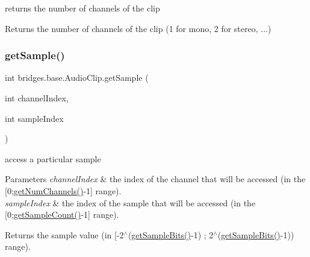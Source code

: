 returns the number of channels of the clip 

\begin{DoxyReturn}{Returns}
the number of channels of the clip (1 for mono, 2 for stereo, ...) 
\end{DoxyReturn}
\mbox{\label{classbridges_1_1base_1_1_audio_clip_a0db520ed7ad301161e03a55b783856f8}} 
\subsubsection{\texorpdfstring{get\+Sample()}{getSample()}}
{\footnotesize\ttfamily int bridges.\+base.\+Audio\+Clip.\+get\+Sample (\begin{DoxyParamCaption}\item[{int}]{channel\+Index,  }\item[{int}]{sample\+Index }\end{DoxyParamCaption})}



access a particular sample 


\begin{DoxyParams}{Parameters}
{\em channel\+Index} & the index of the channel that will be accessed (in the \mbox{[}0;\hyperlink{classbridges_1_1base_1_1_audio_clip_a09e8b5da5249851f7583e910f24b0395}{get\+Num\+Channels()}-\/1\mbox{]} range). \\
\hline
{\em sample\+Index} & the index of the sample that will be accessed (in the \mbox{[}0;\hyperlink{classbridges_1_1base_1_1_audio_clip_a8ad739b7a085787028b4278d65b1b3f4}{get\+Sample\+Count()}-\/1\mbox{]} range). \\
\hline
\end{DoxyParams}
\begin{DoxyReturn}{Returns}
the sample value (in \mbox{[}-\/2$^\wedge$(\hyperlink{classbridges_1_1base_1_1_audio_clip_a59e5a3f38768e52c15e43b5679f3f09c}{get\+Sample\+Bits()}-\/1) ; 2$^\wedge$(\hyperlink{classbridges_1_1base_1_1_audio_clip_a59e5a3f38768e52c15e43b5679f3f09c}{get\+Sample\+Bits()}-\/1)) range). 
\end{DoxyReturn}
\mbox{\label{classbridges_1_1base_1_1_audio_clip_a59e5a3f38768e52c15e43b5679f3f09c}} 
